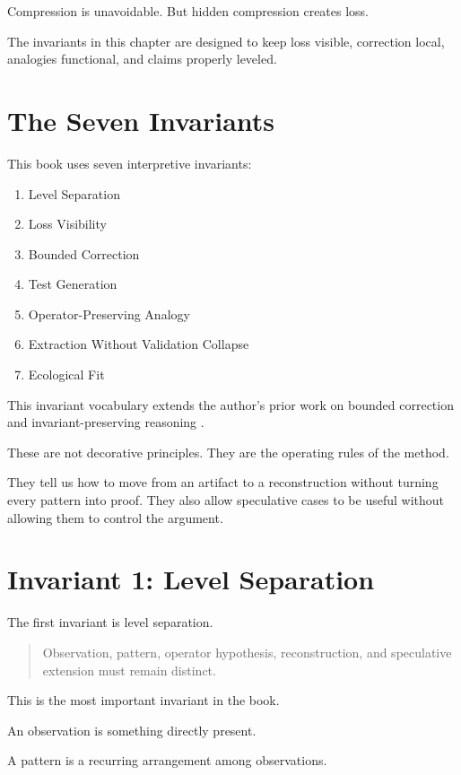 \documentclass[11pt]{book}
\begin{document}
Compression is unavoidable. But hidden compression creates loss.

The invariants in this chapter are designed to keep loss visible, correction local, analogies functional, and claims properly leveled.

\section{The Seven Invariants}

This book uses seven interpretive invariants:

\begin{enumerate}[label=\arabic*.]
    \item Level Separation
    \item Loss Visibility
    \item Bounded Correction
    \item Test Generation
    \item Operator-Preserving Analogy
    \item Extraction Without Validation Collapse
    \item Ecological Fit
\end{enumerate}

This invariant vocabulary extends the author's prior work on bounded correction and invariant-preserving reasoning \cite{Cameron2026PMC,Cameron2026IPRP}.

These are not decorative principles. They are the operating rules of the method.

They tell us how to move from an artifact to a reconstruction without turning every pattern into proof. They also allow speculative cases to be useful without allowing them to control the argument.

\section{Invariant 1: Level Separation}

The first invariant is level separation.

\begin{quote}
Observation, pattern, operator hypothesis, reconstruction, and speculative extension must remain distinct.
\end{quote}

This is the most important invariant in the book.

An observation is something directly present.

A pattern is a recurring arrangement among observations.
\end{document}
